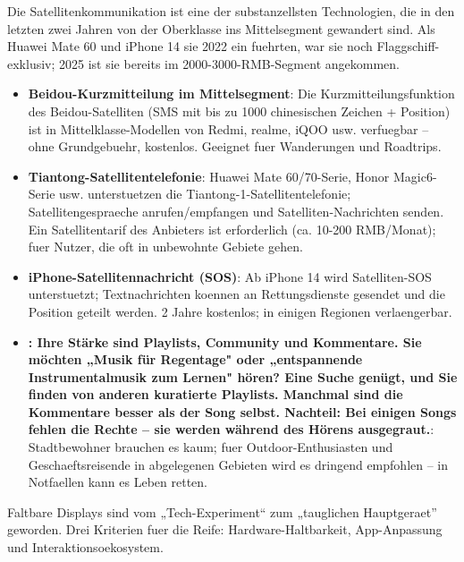 
Die Satellitenkommunikation ist eine der substanzellsten Technologien, die in den letzten zwei Jahren von der Oberklasse ins Mittelsegment gewandert sind. Als Huawei Mate 60 und iPhone 14 sie 2022 ein fuehrten, war sie noch Flaggschiff-exklusiv; 2025 ist sie bereits im 2000-3000-RMB-Segment angekommen.

\begin{itemize}
  \item \textbf{Beidou-Kurzmitteilung im Mittelsegment}: Die Kurzmitteilungsfunktion des Beidou-Satelliten (SMS mit bis zu 1000 chinesischen Zeichen + Position) ist in Mittelklasse-Modellen von Redmi, realme, iQOO usw. verfuegbar – ohne Grundgebuehr, kostenlos. Geeignet fuer Wanderungen und Roadtrips.
  \item \textbf{Tiantong-Satellitentelefonie}: Huawei Mate 60/70-Serie, Honor Magic6-Serie usw. unterstuetzen die Tiantong-1-Satellitentelefonie; Satellitengespraeche anrufen/empfangen und Satelliten-Nachrichten senden. Ein Satellitentarif des Anbieters ist erforderlich (ca. 10-200 RMB/Monat); fuer Nutzer, die oft in unbewohnte Gebiete gehen.
  \item \textbf{iPhone-Satellitennachricht (SOS)}: Ab iPhone 14 wird Satelliten-SOS unterstuetzt; Textnachrichten koennen an Rettungsdienste gesendet und die Position geteilt werden. 2 Jahre kostenlos; in einigen Regionen verlaengerbar.
  \item \textbf{: Ihre Stärke sind Playlists, Community und Kommentare. Sie möchten „Musik für Regentage" oder „entspannende Instrumentalmusik zum Lernen" hören? Eine Suche genügt, und Sie finden von anderen kuratierte Playlists. Manchmal sind die Kommentare besser als der Song selbst. Nachteil: Bei einigen Songs fehlen die Rechte – sie werden während des Hörens ausgegraut.}: Stadtbewohner brauchen es kaum; fuer Outdoor-Enthusiasten und Geschaeftsreisende in abgelegenen Gebieten wird es dringend empfohlen – in Notfaellen kann es Leben retten.
\end{itemize}


Faltbare Displays sind vom „Tech-Experiment“ zum „tauglichen Hauptgeraet” geworden. Drei Kriterien fuer die Reife: Hardware-Haltbarkeit, App-Anpassung und Interaktionsoekosystem.

